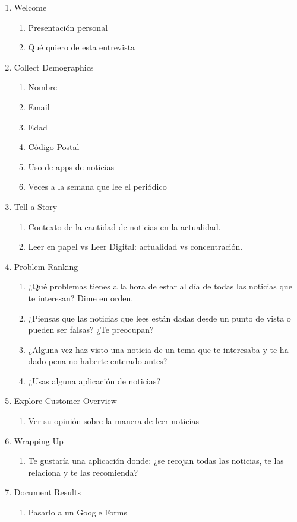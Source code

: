 \begin{enumerate}
    \item Welcome
    \begin{enumerate}
        \item Presentación personal
        \item Qué quiero de esta entrevista
    \end{enumerate}
    \item Collect Demographics
    \begin{enumerate}
        \item Nombre
        \item Email
        \item Edad
        \item Código Postal
        \item Uso de apps de noticias
        \item Veces a la semana que lee el periódico
    \end{enumerate}
    \item Tell a Story
    \begin{enumerate}
        \item Contexto de la cantidad de noticias en la actualidad.
        \item Leer en papel vs Leer Digital: actualidad vs concentración.
    \end{enumerate}
    \item Problem Ranking
    \begin{enumerate}
        \item ¿Qué problemas tienes a la hora de estar al día de todas las noticias que te interesan? Dime en orden.
        \item ¿Piensas que las noticias que lees están dadas desde un punto de vista o pueden ser falsas? ¿Te preocupan?
        \item ¿Alguna vez haz visto una noticia de un tema que te interesaba y te ha dado pena no haberte enterado antes?
        \item ¿Usas alguna aplicación de noticias?
    \end{enumerate}
    \item Explore Customer Overview
    \begin{enumerate}
        \item Ver su opinión sobre la manera de leer noticias
    \end{enumerate}
    \item Wrapping Up
    \begin{enumerate}
        \item Te gustaría una aplicación donde: ¿se recojan todas las noticias, te las relaciona y te las recomienda?
    \end{enumerate}
    \item Document Results
    \begin{enumerate}
        \item Pasarlo a un Google Forms
    \end{enumerate}
\end{enumerate}


